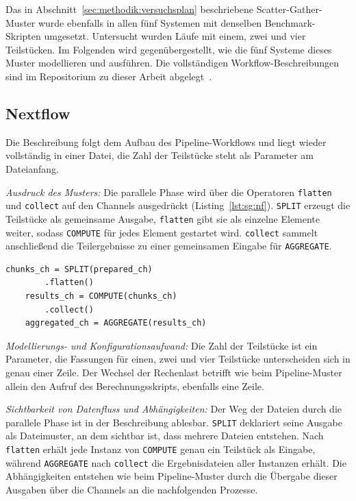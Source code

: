 Das in Abschnitt~\ref{sec:methodik:versuchsplan} beschriebene
Scatter-Gather-Muster wurde ebenfalls in allen fünf Systemen mit
denselben Benchmark-Skripten umgesetzt. Untersucht wurden Läufe mit
einem, zwei und vier Teilstücken. Im Folgenden wird
gegenübergestellt, wie die fünf Systeme dieses Muster modellieren
und ausführen. Die vollständigen Workflow-Beschreibungen sind im
Repositorium zu dieser Arbeit abgelegt~\cite{barepo}.

\subsection{Nextflow}
\label{sec:lokal:sg:nextflow}

Die Beschreibung folgt dem Aufbau des Pipeline-Workflows und liegt
wieder vollständig in einer Datei, die Zahl der Teilstücke steht als
Parameter am Dateianfang.

\emph{Ausdruck des Musters:} Die parallele Phase wird über die
Operatoren \texttt{flatten} und \texttt{collect} auf den Channels
ausgedrückt (Listing~\ref{lst:sg:nf}). \texttt{SPLIT} erzeugt die Teilstücke als gemeinsame
Ausgabe, \texttt{flatten} gibt sie als einzelne Elemente weiter,
sodass \texttt{COMPUTE} für jedes Element gestartet wird.
\texttt{collect} sammelt anschließend die Teilergebnisse zu einer
gemeinsamen Eingabe für \texttt{AGGREGATE}.

\begin{lstlisting}[caption={Fan-out und Fan-in im workflow-Block (Nextflow, Scatter-Gather)},label={lst:sg:nf}]
    chunks_ch = SPLIT(prepared_ch)
        .flatten()
    results_ch = COMPUTE(chunks_ch)
        .collect()
    aggregated_ch = AGGREGATE(results_ch)
\end{lstlisting}

\emph{Modellierungs- und Konfigurationsaufwand:} Die Zahl der
Teilstücke ist ein Parameter, die Fassungen für einen, zwei und vier
Teilstücke unterscheiden sich in genau einer Zeile. Der Wechsel der
Rechenlast betrifft wie beim Pipeline-Muster allein den Aufruf des
Berechnungsskripts, ebenfalls eine Zeile.

\emph{Sichtbarkeit von Datenfluss und Abhängigkeiten:} Der Weg der
Dateien durch die parallele Phase ist in der Beschreibung ablesbar.
\texttt{SPLIT} deklariert seine Ausgabe als Dateimuster, an dem
sichtbar ist, dass mehrere Dateien entstehen. Nach
\texttt{flatten} erhält jede Instanz von \texttt{COMPUTE} genau ein
Teilstück als Eingabe, während \texttt{AGGREGATE} nach
\texttt{collect} die Ergebnisdateien aller Instanzen erhält. Die
Abhängigkeiten entstehen wie beim Pipeline-Muster durch die
Übergabe dieser Ausgaben über die Channels an die nachfolgenden
Prozesse.

